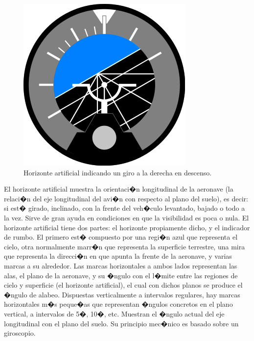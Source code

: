 \begin{figure}
	\centering
	\includegraphics[width=0.8\linewidth]{Imagenes/horizonte_artificial}
	\caption{Horizonte artificial indicando un giro a la derecha en descenso.}
	\label{fig:horizonte_artificial}
\end{figure}


El horizonte artificial muestra la orientaci�n longitudinal de la aeronave (la relaci�n del eje longitudinal del avi�n con respecto al plano del suelo), es decir: si est� girado, inclinado, con la frente del veh�culo levantado, bajado o todo a la vez. Sirve de gran ayuda en condiciones en que la visibilidad es poca o nula. El horizonte artificial tiene dos partes: el horizonte propiamente dicho, y el indicador de rumbo. El primero est� compuesto por una regi�n azul que representa el cielo, otra normalmente marr�n que representa la superficie terrestre, una mira que representa la direcci�n en que apunta la frente de la aeronave, y varias marcas a su alrededor. Las marcas horizontales a ambos lados representan las alas, el plano de la aeronave, y su �ngulo con el l�mite entre las regiones de cielo y superficie (el horizonte artificial), el cual con dichos planos se produce el �ngulo de alabeo. Dispuestas verticalmente a intervalos regulares, hay marcas horizontales m�s peque�as que representan �ngulos concretos en el plano vertical, a intervalos de 5�, 10�, etc. Muestran el �ngulo actual del eje longitudinal con el plano del suelo. Su principio mec�nico es basado sobre un giroscopio.


